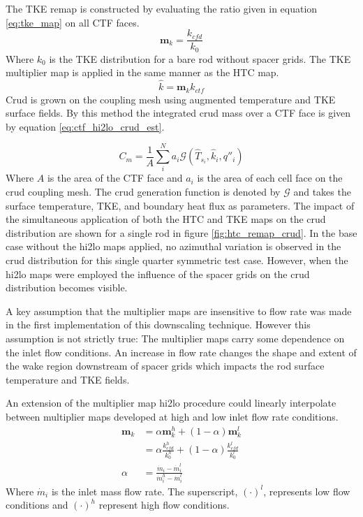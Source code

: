     The TKE remap is constructed by evaluating the ratio given in equation \ref{eq:tke_map} on all CTF faces.
    \begin{equation}
       \mathbf m_{k} = \frac{k_{cfd}}{k_{0}}
       \label{eq:tke_map}
    \end{equation}
    Where $k_0$ is the TKE distribution for a bare rod without spacer grids.
    The TKE multiplier map is applied in the same manner as the HTC map.
       \begin{equation}
       \hat k = \mathbf m_k k_{ctf}
       \end{equation}
Crud is grown on the coupling mesh using augmented temperature and TKE surface fields. By this method the integrated crud mass over a CTF face is given by equation \ref{eq:ctf_hi2lo_crud_est}.

 \begin{equation}
     C_m = \frac{1}{A} \sum_i^N a_i \mathcal G(\hat T_{s_i}, \hat k_i, q''_i) 
 \label{eq:ctf_hi2lo_crud_est}
 \end{equation}
Where $A$ is the area of the CTF face and $a_i$ is the area of each cell face on the crud coupling mesh.  The crud generation function is denoted by $\mathcal G$ and takes the surface temperature, TKE, and boundary heat flux as parameters.  The impact of the simultaneous application of both the HTC and TKE maps on the crud distribution are shown for a single rod in figure \ref{fig:htc_remap_crud}.  In the base case without the hi2lo maps applied, no azimuthal variation is observed in the crud distribution for this single quarter symmetric test case.  However, when the hi2lo maps were employed the influence of the spacer grids on the crud distribution becomes visible.  

A key assumption that the multiplier maps are insensitive to flow rate was made in the first implementation of this downscaling technique.  However this assumption is not strictly true: The multiplier maps carry some dependence on the inlet flow conditions.  An increase in flow rate changes the shape and extent of the wake region downstream of spacer grids which impacts the rod surface temperature and TKE fields.

    An extension of the multiplier map hi2lo procedure could linearly interpolate between multiplier maps developed at high and low inlet flow rate conditions.
    \begin{align*}
        \mathbf m_k &= \alpha \mathbf m_k^h + (1 - \alpha) \mathbf m_k^l \\
                    &= \alpha \frac{k^h_{cfd}}{k^h_0} + (1 - \alpha) \frac{k^l_{cfd}}{k^l_0} \\
        \alpha & = \frac{\dot m_i - \dot m_i^l }{\dot m_i^h - \dot m_i^l}
    \end{align*}
    Where $\dot m_i$ is the inlet mass flow rate.  The superscript, $(\cdot)^l$, represents low flow conditions and $(\cdot)^h$ represent high flow conditions.


